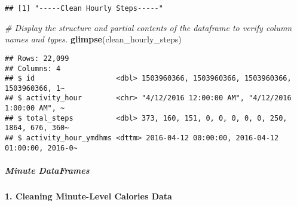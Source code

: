\documentclass[
]{article}
\newenvironment{Shaded}{\begin{snugshade}}{\end{snugshade}}
\newcommand{\AttributeTok}[1]{\textcolor[rgb]{0.13,0.29,0.53}{#1}}
\newcommand{\CommentTok}[1]{\textcolor[rgb]{0.56,0.35,0.01}{\textit{#1}}}
\newcommand{\FunctionTok}[1]{\textcolor[rgb]{0.13,0.29,0.53}{\textbf{#1}}}
\newcommand{\NormalTok}[1]{#1}
\newcommand{\OtherTok}[1]{\textcolor[rgb]{0.56,0.35,0.01}{#1}}
\newcommand{\SpecialCharTok}[1]{\textcolor[rgb]{0.81,0.36,0.00}{\textbf{#1}}}
\newcommand{\StringTok}[1]{\textcolor[rgb]{0.31,0.60,0.02}{#1}}
\begin{document}
\begin{Shaded}
\end{Shaded}

\begin{verbatim}
## [1] "-----Clean Hourly Steps-----"
\end{verbatim}

\begin{Shaded}
\begin{Highlighting}[]
\CommentTok{\# Display the structure and partial contents of the dataframe to verify column names and types.}
\FunctionTok{glimpse}\NormalTok{(clean\_hourly\_steps)}
\end{Highlighting}
\end{Shaded}

\begin{verbatim}
## Rows: 22,099
## Columns: 4
## $ id                   <dbl> 1503960366, 1503960366, 1503960366, 1503960366, 1~
## $ activity_hour        <chr> "4/12/2016 12:00:00 AM", "4/12/2016 1:00:00 AM", ~
## $ total_steps          <dbl> 373, 160, 151, 0, 0, 0, 0, 0, 250, 1864, 676, 360~
## $ activity_hour_ymdhms <dttm> 2016-04-12 00:00:00, 2016-04-12 01:00:00, 2016-0~
\end{verbatim}

\hypertarget{minute-dataframes-1}{%
\subparagraph{Minute DataFrames}\label{minute-dataframes-1}}

\textbf{1. Cleaning Minute-Level Calories Data}
\end{document}
